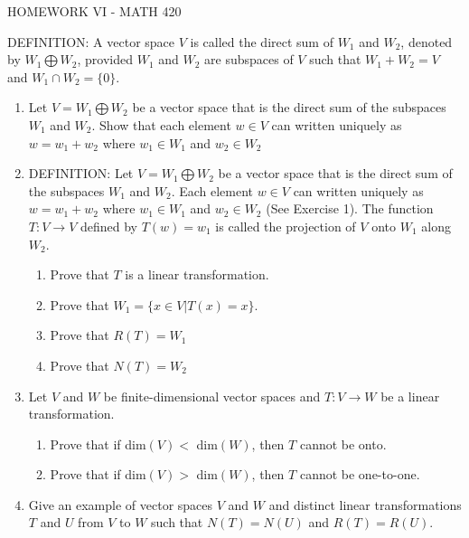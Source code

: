 \documentclass{article}
\begin{document}
\centerline{HOMEWORK VI - MATH 420}

\noindent
DEFINITION:  A vector space $V$ is called the direct sum of $W_1$ and $W_2$, denoted by $W_1\bigoplus W_2$, provided
 $W_1$ and $W_2$  are subspaces of $V$ such that $W_1+W_2=V$  and $W_1\cap W_2=\{0\}$.

 \medskip \noindent




\begin{enumerate}

\item Let $V=W_1\bigoplus W_2$ be a vector space that is the direct sum of the subspaces $W_1$ and $W_2$.  Show that each element $w\in V$ can written uniquely as $w=w_1+w_2$ where $w_1\in W_1$ and  $w_2\in W_2$
\item

DEFINITION:  Let $V=W_1\bigoplus W_2$ be a vector space that is the direct sum of the subspaces $W_1$ and $W_2$.  Each element $w\in V$ can written uniquely as $w=w_1+w_2$ where $w_1\in W_1$ and  $w_2\in W_2$ (See Exercise 1).
 The function $T:V \rightarrow V$ defined by $T(w)=w_1$
  is called the projection of $V$ onto $W_1$
  along $W_2$.
\begin{enumerate}
\item  Prove that $T$ is a linear transformation.
\item  Prove that $W_1=\{x\in V | T(x)=x\}$.
\item  Prove that $R(T)=W_1$
\item  Prove that $N(T)=W_2$
\end{enumerate}



\item
Let $V$ and $W$ be finite-dimensional vector spaces and $T:V\rightarrow W$  be a linear transformation.
\begin{enumerate}
\item Prove that if dim$(V)<$ dim$(W)$, then $T$ cannot be onto.
\item Prove that if dim$(V)>$ dim$(W)$, then $T$ cannot be one-to-one.
\end{enumerate}


\item  Give an example of vector spaces $V$ and $W$ and distinct linear transformations $T$ and $U$ from $V$ to $W$ such that $N(T)=N(U)$ and $R(T)=R(U)$.

     \end{enumerate}
     
\end{document}
